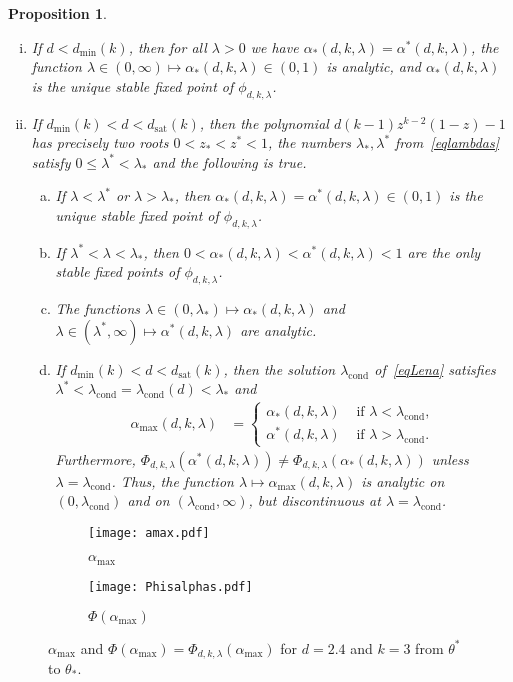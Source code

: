 \documentclass[10pt,reqno]{amsart}
\numberwithin{equation}{section}
\newcommand\dmin{d_{\mathrm{min}}}
\newcommand\dsat{d_{\mathrm{sat}}}
\newcommand{\amax}{\alpha_{\max}}
\newcommand{\lcond}{\lambda_{\mathrm{cond}}}
\newtheorem{proposition}[definition]{Proposition}
\newcommand{\ph}{\phi_{d,k,\lambda}}
\newcommand{\Ph}{\Phi_{d,k,\lambda}}
\begin{document}
\begin{proposition}\label{prop_greg}
~
	\begin{enumerate}[(i)]
		\item If $d<\dmin(k)$, then for all $\lambda>0$ we have $\alpha_*(d,k,\lambda)=\alpha^*(d,k,\lambda)$, the function $\lambda\in(0,\infty)\mapsto\alpha_*(d,k,\lambda)\in(0,1)$ is analytic, and $\alpha_*(d,k,\lambda)$ is the unique stable fixed point of $\ph$.
		\item If $\dmin(k)<d<\dsat(k)$, then the polynomial $d(k-1)z^{k-2}(1-z)-1$ has precisely two roots $0<z_*<z^*<1$, the numbers $\lambda_*,\lambda^*$ from~\eqref{eqlambdas} satisfy $0\leq \lambda^*<\lambda_*$ and the following is true.
			\begin{enumerate}[(a)]
				\item If $\lambda<\lambda^*$ or $\lambda>\lambda_*$, then $\alpha_*(d,k,\lambda)=\alpha^*(d,k,\lambda)\in(0,1)$ is the unique stable fixed point of $\ph$.
				\item If $\lambda^*<\lambda<\lambda_*$, then $0<\alpha_*(d,k,\lambda)<\alpha^*(d,k,\lambda)<1$ are the only stable fixed points of $\ph$.
				\item  The functions $\lambda\in(0,\lambda_*)\mapsto\alpha_*(d,k,\lambda)$ and $\lambda\in(\lambda^*,\infty)\mapsto\alpha^*(d,k,\lambda)$ are analytic.
\item If $\dmin(k)<d<\dsat(k)$, then the solution $\lcond$ of~\eqref{eqLena} satisfies $\lambda^*<\lcond=\lcond(d)<\lambda_*$ and
			\begin{align*}
				\amax(d,k,\lambda)&=\begin{cases}
					\alpha_*(d,k,\lambda)&\mbox{ if }\lambda<\lcond,\\
					\alpha^*(d,k,\lambda)&\mbox{ if }\lambda>\lcond.
				\end{cases}
			\end{align*}
			Furthermore, $\Ph(\alpha^*(d,k,\lambda))\neq\Ph(\alpha_*(d,k,\lambda))$ unless $\lambda=\lcond$.
			Thus, the function $\lambda\mapsto\amax(d,k,\lambda)$ is analytic on $(0,\lcond)$ and on $(\lcond,\infty)$, but discontinuous at $\lambda=\lcond$.
		\end{enumerate}
		\end{enumerate}
	\end{proposition}


\begin{figure}
\begin{subfigure}[b]{0.45\textwidth}
		\texttt{[image: amax.pdf]}
		\caption{$\amax$ }
	\end{subfigure}
\begin{subfigure}[b]{0.45\textwidth}		
		\texttt{[image: Phisalphas.pdf]}
\caption{$\Phi(\amax)$}
	\end{subfigure}
	\caption{$\amax$ and $\Phi(\amax) = \Phi_{d,k,\lambda}(\amax)$ for $d=2.4$ and $k=3$ from $\theta^*$ to $\theta_*$.}
	\label{fig_amax}
\end{figure}
\end{document}

